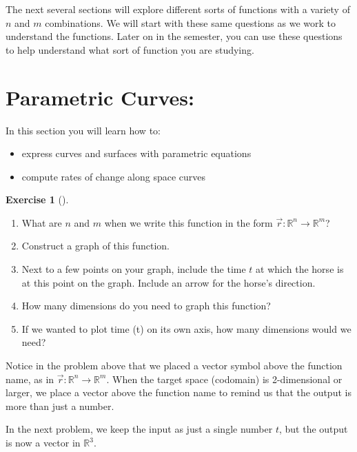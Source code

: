 \documentclass[10pt,]{book}
\theoremstyle{plain}
\theoremstyle{definition}
\theoremstyle{definition}
\theoremstyle{definition}
\theoremstyle{definition}
\newtheorem{exploration}[project]{Exercise}
\theoremstyle{definition}
\numberwithin{equation}{section}
\begin{document}
The next several sections will explore different sorts of functions with a variety of \(n\) and \(m\) combinations. We will start with these same questions as we work to understand the functions. Later on in the semester, you can use these questions to help understand what sort of function you are studying.%
\typeout{************************************************}
\typeout{************************************************}
\section[{Parametric Curves:}]{Parametric Curves:}\label{section-16}
In this section you will learn how to: \leavevmode%
\begin{itemize}[label=\textbullet]
\item{}express curves and surfaces with parametric equations%
\item{}compute rates of change along space curves%
\end{itemize}
%
\begin{exploration}[]\label{prob_parametric_curve_in_plane}
\leavevmode%
\begin{enumerate}[font=\bfseries,label=(\alph*),ref=\alph*]
\item\label{task-169} What are \(n\) and \(m\) when we write this function in the form  \(\vec r\colon {\mathbb{R}}^n\to {\mathbb{R}}^m\)?%
\item\label{task-170} Construct a graph of this function.%
\item\label{task-171} Next to a few points on your graph, include the time \(t\) at which the horse is at this point on the graph. Include an arrow for the horse's direction.%
\item\label{task-172} How many dimensions do you need to graph this function?%
\item\label{task-173} If we wanted to plot time (t) on its own axis, how many dimensions would we need?%
\end{enumerate}
\end{exploration}
Notice in the problem above that we placed a vector symbol above the function name, as in \(\vec r\colon {\mathbb{R}}^n\to {\mathbb{R}}^m\). When the target space (codomain) is 2-dimensional or larger, we place a vector above the function name to remind us that the output is more than just a number.%
\par
In the next problem, we keep the input as just a single number \(t\), but the output is now a vector in \(\mathbb{R}^3\).%
\end{document}
